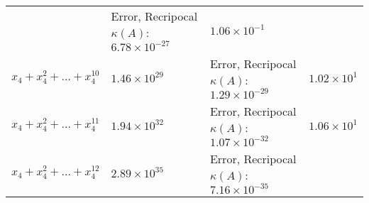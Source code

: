 \documentclass[
]{article}
\begin{document}
\begin{longtable}[]{@{}llll@{}}
\begin{minipage}[t]{0.15\columnwidth}
\end{minipage} & \begin{minipage}[t]{0.36\columnwidth}\raggedright
Error, Recripocal \(\kappa(A)\): \(6.78 \times 10^{-27}\)\strut
\end{minipage} & \begin{minipage}[t]{0.15\columnwidth}\raggedright
\(1.06 \times 10^{-1}\)\strut
\end{minipage}\tabularnewline
\begin{minipage}[t]{0.23\columnwidth}\raggedright
\(x_{4}+x_{4}^{2}+\dots+x_{4}^{10}\)\strut
\end{minipage} & \begin{minipage}[t]{0.15\columnwidth}\raggedright
\(1.46 \times 10^{29}\)\strut
\end{minipage} & \begin{minipage}[t]{0.36\columnwidth}\raggedright
Error, Recripocal \(\kappa(A)\): \(1.29 \times 10^{-29}\)\strut
\end{minipage} & \begin{minipage}[t]{0.15\columnwidth}\raggedright
\(1.02 \times 10^{1}\)\strut
\end{minipage}\tabularnewline
\begin{minipage}[t]{0.23\columnwidth}\raggedright
\(x_{4}+x_{4}^{2}+\dots+x_{4}^{11}\)\strut
\end{minipage} & \begin{minipage}[t]{0.15\columnwidth}\raggedright
\(1.94 \times 10^{32}\)\strut
\end{minipage} & \begin{minipage}[t]{0.36\columnwidth}\raggedright
Error, Recripocal \(\kappa(A)\): \(1.07 \times 10^{-32}\)\strut
\end{minipage} & \begin{minipage}[t]{0.15\columnwidth}\raggedright
\(1.06 \times 10^{1}\)\strut
\end{minipage}\tabularnewline
\begin{minipage}[t]{0.23\columnwidth}\raggedright
\(x_{4}+x_{4}^{2}+\dots+x_{4}^{12}\)\strut
\end{minipage} & \begin{minipage}[t]{0.15\columnwidth}\raggedright
\(2.89 \times 10^{35}\)\strut
\end{minipage} & \begin{minipage}[t]{0.36\columnwidth}\raggedright
Error, Recripocal \(\kappa(A)\): \(7.16 \times 10^{-35}\)\strut
\end{minipage} & \begin{minipage}[t]{0.15\columnwidth}\raggedright

\end{minipage}
\end{longtable}
\end{document}

